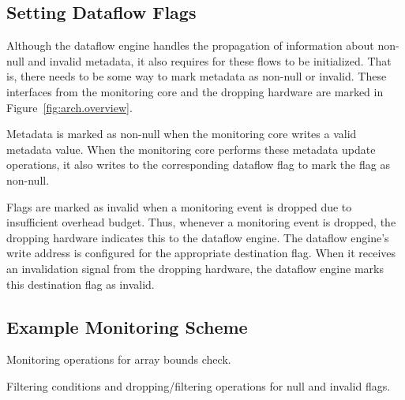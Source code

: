 \subsection{Setting Dataflow Flags}
\label{sec:arch.dropping}

Although the dataflow engine handles the propagation of information about
non-null and invalid metadata, it also requires for these flows to be
initialized. That is, there needs to be some way to mark metadata as non-null
or invalid. These interfaces from the monitoring core and the dropping hardware
are marked in Figure~\ref{fig:arch.overview}.

Metadata is marked as non-null when the monitoring core writes a valid metadata
value. When the monitoring core performs these metadata update operations, it
also writes to the corresponding dataflow flag to mark the flag as non-null.

Flags are marked as invalid when a monitoring event is dropped due to
insufficient overhead budget. Thus, whenever a monitoring event is dropped, the
dropping hardware indicates this to the dataflow engine. The dataflow engine's
write address is configured for the appropriate destination flag. When it
receives an invalidation signal from the dropping hardware, the
dataflow engine marks this destination flag as invalid.

\subsection{Example Monitoring Scheme}

\begin{table}[tb]
  \begin{center}
    \begin{small}
    
    \end{small}
    \caption{Monitoring operations for array bounds check.}
    \label{tab:arch.monitor}
    \vspace{-0.2in}
  \end{center}
\end{table}

\begin{table}[tb]
  \begin{center}
    \begin{small}
    
    \end{small}
    \caption{Filtering conditions and dropping/filtering operations for null and invalid flags.}
    \label{tab:arch.dataflow_operations}
    \vspace{-0.2in}
  \end{center}
\end{table}

